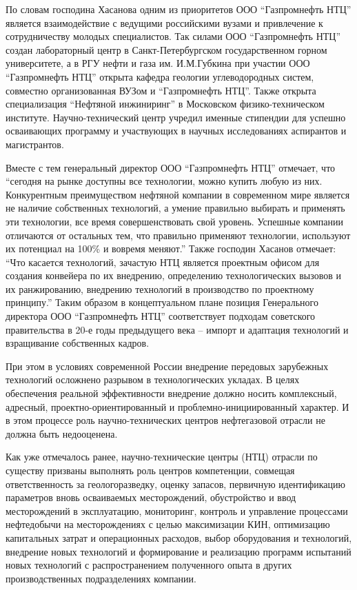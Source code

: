 По словам господина Хасанова одним из приоритетов ООО ``Газпромнефть НТЦ'' является взаимодействие с ведущими российскими вузами и привлечение к сотрудничеству молодых специалистов.
Так силами ООО ``Газпромнефть НТЦ'' создан лабораторный центр в Санкт-Петербургском государственном горном университете, а в РГУ нефти и газа им. И.М.Губкина при участии ООО ``Газпромнефть НТЦ'' открыта кафедра геологии углеводородных систем, совместно организованная ВУЗом и ``Газпромнефть НТЦ''.
Также открыта специализация ``Нефтяной инжиниринг'' в Московском физико-техническом институте.
Научно-технический центр учредил именные стипендии для успешно осваивающих программу и участвующих в научных исследованиях аспирантов и магистрантов.

Вместе с тем генеральный директор ООО ``Газпромнефть НТЦ'' отмечает, что ``сегодня на рынке доступны все технологии, можно купить любую из них.
Конкурентным преимуществом нефтяной компании в современном мире является не наличие собственных технологий, а умение правильно выбирать и применять эти технологии, все время совершенствовать свой уровень.
Успешные компании отличаются от остальных тем, что правильно применяют технологии, используют их потенциал на 100\% и вовремя меняют.''  Также господин Хасанов отмечает: ``Что касается технологий, зачастую НТЦ является проектным офисом для создания конвейера по их внедрению, определению технологических вызовов и их ранжированию, внедрению технологий в производство по проектному принципу.''
Таким образом в концептуальном плане позиция Генерального директора ООО ``Газпромнефть НТЦ'' соответствует подходам советского правительства в 20-е годы предыдущего века -- импорт и адаптация технологий и взращивание собственных кадров.

При этом в условиях современной России внедрение передовых зарубежных технологий осложнено разрывом в технологических укладах.
В целях обеспечения реальной эффективности внедрение должно носить комплексный, адресный, проектно-ориентированный и проблемно-инициированный характер.
И в этом процессе роль научно-технических центров нефтегазовой отрасли не должна быть недооценена.

Как уже отмечалось ранее, научно-технические центры (НТЦ) отрасли по существу призваны выполнять роль центров компетенции, совмещая ответственность за геологоразведку, оценку запасов, первичную идентификацию параметров вновь осваиваемых месторождений, обустройство и ввод месторождений в эксплуатацию, мониторинг, контроль и управление процессами нефтедобычи на месторождениях с целью максимизации КИН, оптимизацию капитальных затрат и операционных расходов, выбор оборудования и технологий, внедрение новых технологий и формирование и реализацию программ испытаний новых технологий с распространением полученного опыта в других производственных подразделениях компании.

